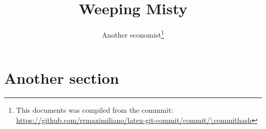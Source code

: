 \documentclass{article}
\newcommand{\reponame}{rrmaximiliano/latex-git-commit}                          %
\newcommand{\commiturl}{\url{https://github.com/\reponame/commit/\commithash}}  %
\begin{document}
\title{Weeping Misty}                                                           %
\author{Another economist\thanks{This documents was compiled from the commmit: \commiturl}}
\maketitle
\begin{abstract}
    \lipsum[1]
\end{abstract}
\section{Another section}
\lipsum[8]
\end{document}
